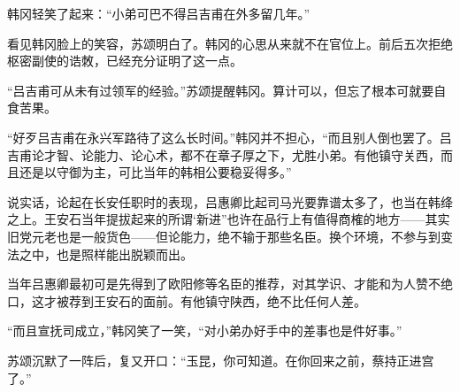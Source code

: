 韩冈轻笑了起来：“小弟可巴不得吕吉甫在外多留几年。”

看见韩冈脸上的笑容，苏颂明白了。韩冈的心思从来就不在官位上。前后五次拒绝枢密副使的诰敇，已经充分证明了这一点。

“吕吉甫可从未有过领军的经验。”苏颂提醒韩冈。算计可以，但忘了根本可就要自食苦果。

“好歹吕吉甫在永兴军路待了这么长时间。”韩冈并不担心，“而且别人倒也罢了。吕吉甫论才智、论能力、论心术，都不在章子厚之下，尤胜小弟。有他镇守关西，而且还是以守御为主，可比当年的韩相公要稳妥得多。”

说实话，论起在长安任职时的表现，吕惠卿比起司马光要靠谱太多了，也当在韩绛之上。王安石当年提拔起来的所谓‘新进”也许在品行上有值得商榷的地方——其实旧党元老也是一般货色——但论能力，绝不输于那些名臣。换个环境，不参与到变法之中，也是照样能出脱颖而出。

当年吕惠卿最初可是先得到了欧阳修等名臣的推荐，对其学识、才能和为人赞不绝口，这才被荐到王安石的面前。有他镇守陕西，绝不比任何人差。

“而且宣抚司成立，”韩冈笑了一笑，“对小弟办好手中的差事也是件好事。”

苏颂沉默了一阵后，复又开口：“玉昆，你可知道。在你回来之前，蔡持正进宫了。”
